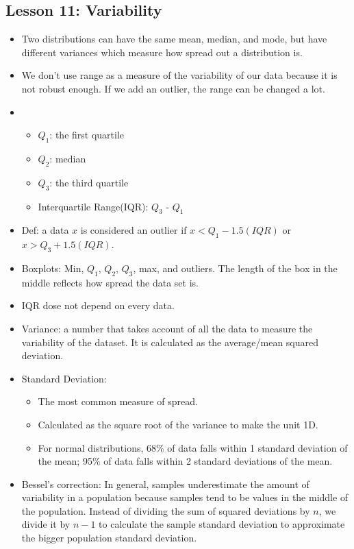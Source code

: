 \documentclass[twoside,12pt]{article}
\begin{document}
\subsection{Lesson 11: Variability}
\begin{itemize}
\item Two distributions can have the same mean, median, and mode, but have different variances which measure how spread out a distribution is. 
\item We don't use range as a measure of the variability of our data because it is not robust enough. If we add an outlier, the range can be changed a lot. 
\item 
\begin{itemize}
\item $Q_1$: the first quartile 
\item $Q_2$: median
\item $Q_3$: the third quartile
\item Interquartile Range(IQR): $Q_3$ - $Q_1$
\end{itemize}
\item Def: a data $x$ is considered an outlier if $x < Q_1 - 1.5 (IQR)$ or $x > Q_3 + 1.5 (IQR)$.
\item Boxplots: Min, $Q_1$, $Q_2$, $Q_3$, max, and outliers. The length of the box in the middle reflects how spread the data set is. 
\item IQR dose not depend on every data.
\item Variance: a number that takes account of all the data to measure the variability of the dataset. It is calculated as the average/mean squared deviation. 
\item Standard Deviation: 
\begin{itemize}
\item The most common measure of spread. 
\item Calculated as the square root of the variance to make the unit 1D.  
\item For normal distributions, 68\% of data falls within 1 standard deviation of the mean; 95\% of data falls within 2 standard deviations of the mean.
\end{itemize}
\item Bessel's correction: In general, samples underestimate the amount of variability in a population because samples tend to be values in the middle of the population. Instead of dividing the sum of squared deviations by $n$, we divide it by $n-1$ to calculate the sample standard deviation to approximate the bigger population standard deviation. 
\end{itemize}
\end{document}
